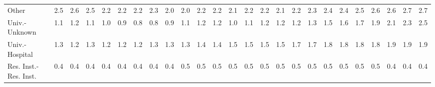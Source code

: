 \begin{tabular}{lrrrrrrrrrrrrrrrrrrrrrrrr}
Other                 &   2.5 &   2.6 &   2.5 &   2.2 &   2.2 &   2.2 &   2.3 &   2.0 &   2.0 &   2.2 &   2.2 &   2.1 &   2.2 &   2.2 &   2.1 &   2.2 &   2.3 &   2.4 &   2.4 &   2.5 &   2.6 &   2.6 &   2.7 &   2.7 \\
Univ.-Unknown         &   1.1 &   1.2 &   1.1 &   1.0 &   0.9 &   0.8 &   0.8 &   0.9 &   1.1 &   1.2 &   1.2 &   1.0 &   1.1 &   1.2 &   1.2 &   1.2 &   1.3 &   1.5 &   1.6 &   1.7 &   1.9 &   2.1 &   2.3 &   2.5 \\
Univ.-Hospital        &   1.3 &   1.2 &   1.3 &   1.2 &   1.2 &   1.2 &   1.3 &   1.3 &   1.3 &   1.4 &   1.4 &   1.5 &   1.5 &   1.5 &   1.5 &   1.7 &   1.7 &   1.8 &   1.8 &   1.8 &   1.8 &   1.9 &   1.9 &   1.9 \\
Res. Inst.-Res. Inst. &   0.4 &   0.4 &   0.4 &   0.4 &   0.4 &   0.4 &   0.4 &   0.4 &   0.5 &   0.5 &   0.5 &   0.5 &   0.5 &   0.5 &   0.5 &   0.5 &   0.5 &   0.5 &   0.5 &   0.5 &   0.5 &   0.4 &   0.4 &   0.4 \\
\bottomrule
\end{tabular}
